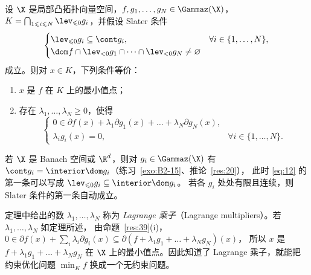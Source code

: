 \begin{theorem}
\label{res:45}
设 $\X$ 是局部凸拓扑向量空间，$f,g_1,\dots,g_N\in\Gammaz(\X)$，$K=\bigcap_{1\leqslant i\leqslant N}\lev_{\leqslant0}g_i$，并假设 Slater 条件
\begin{equation}
  \begin{cases}\lev_{\leqslant0}g_i\subseteq\cont g_i, & \forall i\in\{1,\dots,N\},\\
  \dom f\cap\lev_{<0}g_1\cap\dots\cap\lev_{<0}g_N\neq\varnothing\end{cases}
  \label{eq:12}
\end{equation}
成立。则对 $x\in K$，下列条件等价：
\begin{enumerate}[label=(\roman*)]
  \item $x$ 是 $f$ 在 $K$ 上的最小值点；
  \item 存在 $\lambda_1,\dots,\lambda_N\geqslant0$，使得
        \[
          \begin{cases}0\in\partial f(x)+\lambda_1\partial g_1(x)+\dots+\lambda_N\partial g_N(x),\\
          \lambda_ig_i(x)=0, & \forall i\in\{1,\dots,N\}.\end{cases}
        \]
\end{enumerate}
\end{theorem}

\begin{remark}
\label{rem:18}
若 $\X$ 是 Banach 空间或 $\R^d$，则对 $g_i\in\Gammaz(\X)$ 有 $\cont g_i=\interior\dom g_i$（练习~\ref{exo:B2-15}、推论~\ref{res:20}），
此时 \eqref{eq:12} 的第一条可以写成 $\lev_{\leqslant0}g_i\subseteq\interior\dom g_i$。
若各 $g_i$ 处处有限且连续，则 Slater 条件的第一条自动成立。
\end{remark}

\begin{remark}[Lagrange 乘子]
\label{rem:19}
定理中给出的数 $\lambda_1,\dots,\lambda_N$ 称为 \emph{Lagrange 乘子}（Lagrange multipliers）。若 $\lambda_1,\dots,\lambda_N$ 如定理所述，
由命题~\ref{res:39}(i)，$0\in\partial f(x)+\sum_i\lambda_i\partial g_i(x)\subseteq\partial(f+\lambda_1g_1+\dots+\lambda_Ng_N)(x)$，
所以 $x$ 是 $f+\lambda_1g_1+\dots+\lambda_Ng_N$ 在 $\X$ 上的最小值点。因此知道了 Lagrange 乘子，就能把约束优化问题 $\min_Kf$ 换成一个无约束问题。
\end{remark}

